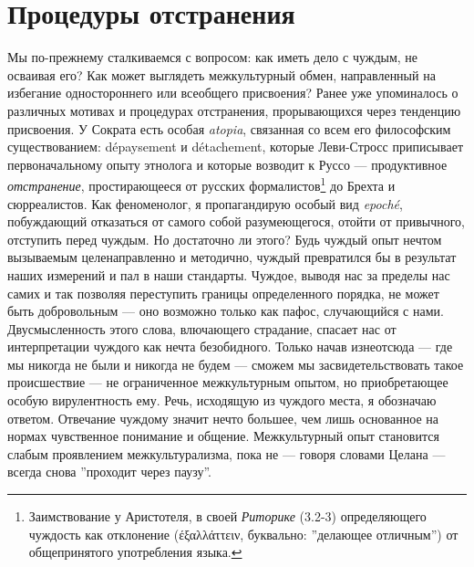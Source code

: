 \documentclass[12pt]{book}
\begin{document}
\section{Процедуры отстранения}

Мы по-прежнему сталкиваемся с вопросом: как иметь дело с чуждым, не осваивая его? Как может выглядеть межкультурный обмен, направленный на избегание одностороннего или всеобщего присвоения? Ранее уже упоминалось о различных мотивах и процедурах отстранения, прорывающихся через тенденцию присвоения. У Сократа есть особая \textit{atopia}, связанная со всем его философским существованием: dépaysement и détachement, которые Леви-Стросс приписывает первоначальному опыту этнолога и которые возводит к Руссо --- продуктивное \textit{отстранение}, простирающееся от русских формалистов\footnote{Заимствование у Аристотеля, в своей \textit{Риторике} (3.2-3) определяющего чуждость как отклонение (έξαλλάττειν, буквально: ''делающее отличным'') от общепринятого употребления языка.} до Брехта и сюрреалистов. Как феноменолог, я пропагандирую особый вид \textit{epoché}, побуждающий отказаться от самого собой разумеющегося, отойти от привычного, отступить перед чуждым. Но достаточно ли этого? Будь чуждый опыт нечтом вызываемым целенаправленно и методично, чуждый превратился бы в результат наших измерений и пал в наши стандарты. Чуждое, выводя нас за пределы нас самих и так позволяя переступить границы определенного порядка, не может быть добровольным --- оно возможно только как пафос, случающийся с нами. Двусмысленность этого слова, влючающего страдание, спасает нас от интерпретации чуждого как нечта безобидного. Только начав изнеотсюда --- где мы никогда не были и никогда не будем --- сможем мы засвидетельствовать такое происшествие --- не ограниченное межкультурным опытом, но приобретающее особую вирулентность ему. Речь, исходящую из чуждого места, я обозначаю ответом. Отвечание чуждому значит нечто большее, чем лишь основанное на нормах чувственное понимание и общение. Межкультурный опыт становится слабым проявлением межкультурализма, пока не --- говоря словами Целана --- всегда снова ''проходит через паузу''.
\end{document}
